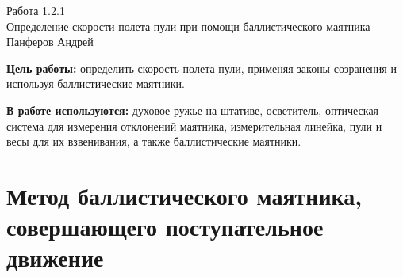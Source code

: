 

\usepackage{centernot}
\usepackage{cancel}



\begin{center}
  \LARGE{Работа 1.2.1}\\[0.2cm]
  \LARGE{Определение скорости полета пули при помощи баллистического маятника}\\[0.2cm]
  \large{Панферов Андрей}\\[0.2cm]
\end{center}

\textbf{Цель работы:} определить скорость полета пули, применяя законы созранения и используя баллистические маятники.

\textbf{В работе используются:} духовое ружье на штативе, осветитель, оптическая система для измерения отклонений маятника, измерительная линейка, пули и весы для их взвенивания, а также баллистические маятники.

\section{Метод баллистического маятника, совершающего поступательное движение}


